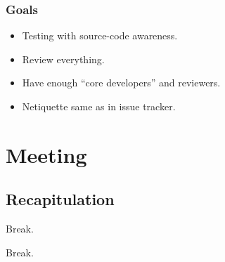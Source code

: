 \begin{frame}
	\frametitle{Goals}

	\begin{itemize}[<+-| alert@+>]
	\item Testing with source-code awareness.
	\item Review everything.
	\item Have enough ``core developers'' and reviewers.
	\item Netiquette same as in issue tracker.
	\end{itemize}
\end{frame}

%


\section{Meeting}

\subsection{Recapitulation}




\begin{assignment}
	\begin{task}
	Break.
	\end{task}
\end{assignment}


\begin{assignment}
	\begin{task}
	Break.
	\end{task}
\end{assignment}


